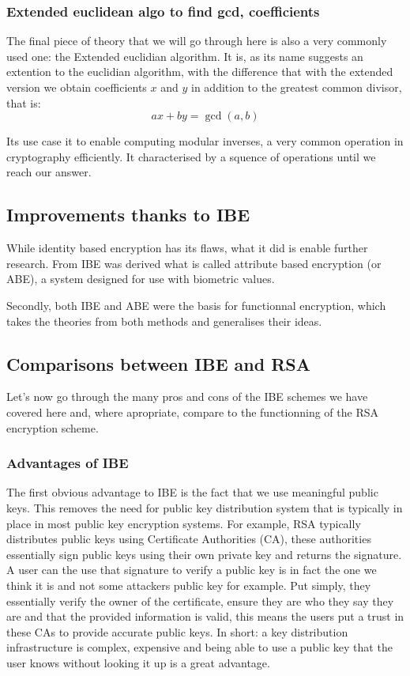 \documentclass[conference]{IEEEtran}
\begin{document}
\subsubsection{Extended euclidean algo to find gcd, coefficients}
The final piece of theory that we will go through here is also a very
commonly used one: the Extended euclidian algorithm. It is, 
as its name suggests an extention to the euclidian algorithm, with 
the difference that with the extended version we obtain coefficients 
$x$ and $y$ in addition to the greatest common divisor, that is:
\begin{equation*}
    ax + by = \gcd(a,b)
\end{equation*}

Its use case it to enable computing modular inverses, a very common operation in 
cryptography efficiently. It characterised by a squence of operations until we reach
our answer.

\subsection{Improvements thanks to IBE}
While identity based encryption has its flaws, what it did 
is enable further research. From IBE was derived what is called
attribute based encryption (or ABE), a system designed 
for use with biometric values.


Secondly, both IBE and ABE were the basis for functionnal encryption, 
which takes the theories from both methods and generalises their ideas.

\subsection{Comparisons between IBE and RSA}
Let's now go through the many pros and cons of the IBE schemes we 
have covered here and, where apropriate, compare to the functionning of the 
RSA encryption scheme.


\subsubsection{Advantages of IBE}
The first obvious advantage to IBE is the fact that we use 
meaningful public keys. This removes the need for public key distribution system
that is typically in place in most public key encryption systems. For example,
RSA typically distributes public keys using Certificate Authorities (CA), these authorities
essentially sign public keys using their own private key and returns the signature. A user
can the use that signature to verify a public key is in fact the one we think it is 
and not some attackers public key for example. Put simply, 
they essentially verify the owner of the certificate, 
ensure they are who they say they are and that the provided information is valid, this
means the users put a trust in these CAs to provide accurate public keys.
In short: a key distribution infrastructure is complex, expensive and being able to 
use a public key that the user knows without looking it up is a great advantage.
\end{document}
